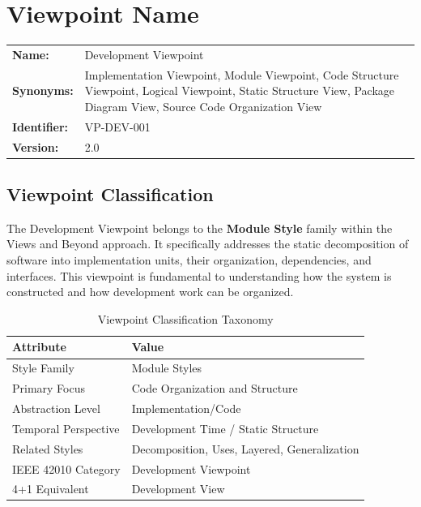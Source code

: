 \documentclass[11pt,letterpaper]{article}
\begin{document}
\section{Viewpoint Name}

\begin{definitionbox}
\begin{tabular}{@{}L{3.5cm}L{10cm}@{}}
\textbf{Name:} & Development Viewpoint \\[0.5em]
\textbf{Synonyms:} & Implementation Viewpoint, Module Viewpoint, Code Structure Viewpoint, Logical Viewpoint, Static Structure View, Package Diagram View, Source Code Organization View \\[0.5em]
\textbf{Identifier:} & VP-DEV-001 \\[0.5em]
\textbf{Version:} & 2.0 \\
\end{tabular}
\end{definitionbox}

\subsection{Viewpoint Classification}

The Development Viewpoint belongs to the \textbf{Module Style} family within the Views and Beyond approach. It specifically addresses the static decomposition of software into implementation units, their organization, dependencies, and interfaces. This viewpoint is fundamental to understanding how the system is constructed and how development work can be organized.

\begin{table}[H]
\centering
\caption{Viewpoint Classification Taxonomy}
\begin{tabular}{@{}L{4cm}L{10cm}@{}}
\toprule
\textbf{Attribute} & \textbf{Value} \\
\midrule
Style Family & Module Styles \\
Primary Focus & Code Organization and Structure \\
Abstraction Level & Implementation/Code \\
Temporal Perspective & Development Time / Static Structure \\
Related Styles & Decomposition, Uses, Layered, Generalization \\
IEEE 42010 Category & Development Viewpoint \\
4+1 Equivalent & Development View \\
\bottomrule
\end{tabular}
\end{table}
\end{document}
